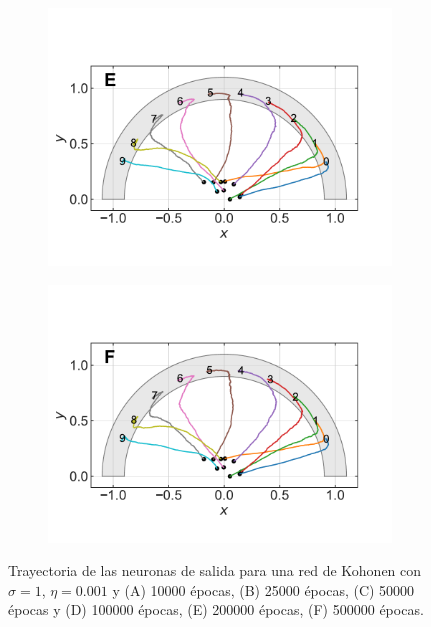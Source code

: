\documentclass[11pt,twocolumn,twoside]{opticajnl}
\begin{document}
\begin{figure}[h]
\begin{subfigure}[b]{0.33\linewidth}
            \includegraphics[width=1.1\textwidth]{Figuras/pesos_sigma_1_epochs_200000_lr_0.001.pdf}
         \end{subfigure}
         \begin{subfigure}[b]{0.33\linewidth}
            \centering
            \includegraphics[width=1.1\textwidth]{Figuras/pesos_sigma_1_epochs_500000_lr_0.001.pdf}
         \end{subfigure}
    \caption{Trayectoria de las neuronas de salida para una red de Kohonen con $\sigma=1$, $\eta=0.001$ y (A) 10000 épocas, (B) 25000 épocas, (C) 50000 épocas y (D) 100000 épocas, (E) 200000 épocas, (F) 500000 épocas.} 
    \label{fig:Kohonen_epocas}
\end{figure}
\end{document}

